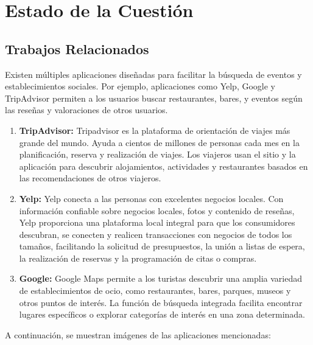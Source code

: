 \chapter{Estado de la Cuestión} 
\section{Trabajos Relacionados}

Existen múltiples aplicaciones diseñadas para facilitar la búsqueda de eventos y establecimientos sociales. Por
ejemplo, aplicaciones como Yelp, Google y TripAdvisor permiten a los usuarios buscar restaurantes, bares, y eventos
según las reseñas y valoraciones de otros usuarios.

\begin{enumerate}
    \item \textbf{TripAdvisor:} Tripadvisor es la plataforma de orientación de viajes más grande del mundo. Ayuda a
          cientos de millones de personas cada mes en la planificación, reserva y realización de viajes. Los viajeros usan
          el sitio y la aplicación para descubrir alojamientos, actividades y restaurantes basados en las recomendaciones
          de otros viajeros.

    \item \textbf{Yelp:} Yelp conecta a las personas con excelentes negocios locales. Con información confiable
          sobre negocios locales, fotos y contenido de reseñas, Yelp proporciona una plataforma local integral para que
          los consumidores descubran, se conecten y realicen transacciones con negocios de todos los tamaños, facilitando
          la solicitud de presupuestos, la unión a listas de espera, la realización de reservas y la programación de citas
          o compras.

    \item \textbf{Google:} Google Maps permite a los turistas descubrir una amplia variedad de establecimientos de
          ocio, como restaurantes, bares, parques, museos y otros puntos de interés. La función de búsqueda integrada
          facilita encontrar lugares específicos o explorar categorías de interés en una zona determinada.

\end{enumerate}

A continuación, se muestran imágenes de las aplicaciones mencionadas:

